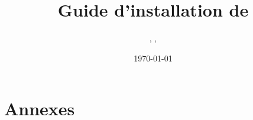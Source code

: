 \documentclass[a4paper, 11pt]{article}
\author{\glsentryname{leo}, \glsentryname{damien}, \glsentryname{pierreLouis}}
\title{Guide d'installation de \glsentryname{sae}}
\date{\normalsize\today} %
\begin{document}
\maketitle

\newpage
{} %


\newpage
\tableofcontents

\newpage


\newpage


\newpage
\part*{Annexes}
\listoffigures
\listoftables

\newpage
\printglossary %

\newpage
\printbibliography %
\end{document}
